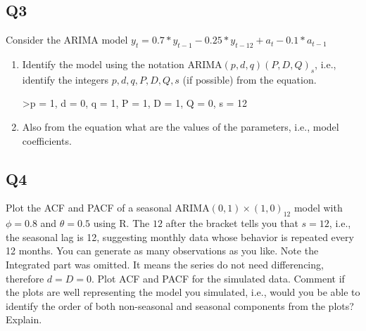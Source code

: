 \documentclass[
]{article}
\begin{document}
\hypertarget{q3}{%
\subsection{Q3}\label{q3}}

Consider the ARIMA model
\(y_t=0.7*y_{t-1}-0.25*y_{t-12}+a_t-0.1*a_{t-1}\)

\begin{enumerate}[label=(\alph*)]

\item Identify the model using the notation ARIMA$(p,d,q)(P,D,Q)_ s$, i.e., identify the integers $p,d,q,P,D,Q,s$ (if possible) from the equation.

>p = 1, d = 0, q = 1, P = 1, D = 1, Q = 0, s = 12


\item Also from the equation what are the values of the parameters, i.e., model coefficients. 

\end{enumerate}

\hypertarget{q4}{%
\subsection{Q4}\label{q4}}

Plot the ACF and PACF of a seasonal ARIMA\((0, 1)\times(1, 0)_{12}\)
model with \(\phi =0 .8\) and \(\theta = 0.5\) using R. The \(12\) after
the bracket tells you that \(s=12\), i.e., the seasonal lag is 12,
suggesting monthly data whose behavior is repeated every 12 months. You
can generate as many observations as you like. Note the Integrated part
was omitted. It means the series do not need differencing, therefore
\(d=D=0\). Plot ACF and PACF for the simulated data. Comment if the
plots are well representing the model you simulated, i.e., would you be
able to identify the order of both non-seasonal and seasonal components
from the plots? Explain.
\end{document}
